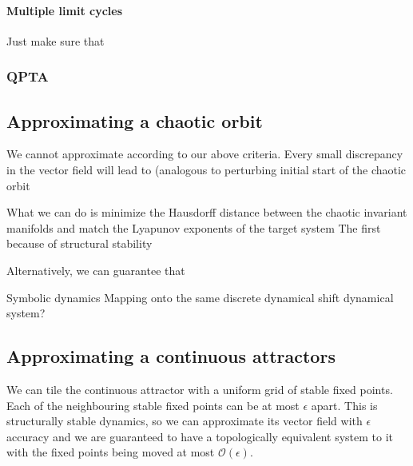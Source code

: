 \documentclass{article}
\theoremstyle{definition}
\theoremstyle{remark}
\begin{document}





\paragraph{Multiple limit cycles}
Just make sure that 


\subsubsection{QPTA}%
\citep{Park2023a}


\subsection{Approximating a chaotic orbit}
We cannot approximate according to our above criteria.
Every small discrepancy in the vector field will lead to 
(analogous to perturbing initial start of the chaotic orbit 


What we can do is minimize the Hausdorff distance between the chaotic invariant manifolds and match the Lyapunov exponents of the target system
The first because of structural stability

Alternatively, we can guarantee that 


Symbolic dynamics
Mapping onto the same discrete dynamical shift dynamical system?



\subsection{Approximating a continuous attractors}

We can tile the continuous attractor with a uniform grid of stable fixed points.
Each of the neighbouring stable fixed points can be at most $\epsilon$ apart.
This is structurally stable dynamics, so we can approximate its vector field with $\epsilon$ accuracy and we are guaranteed to have a topologically equivalent system to it with the fixed points being moved at most $\mathcal{O}(\epsilon)$.
\end{document}
